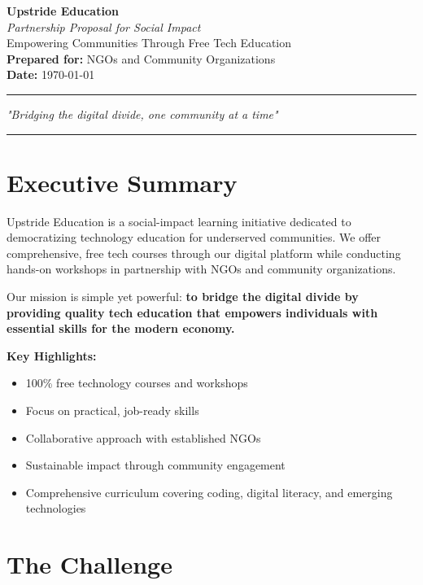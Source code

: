 \documentclass[12pt,a4paper]{article}
\begin{document}
\begin{center}
    {\Huge\textbf{\textcolor{upstrideblue}{Upstride Education}}} \\[0.5cm]
    {\Large\textit{Partnership Proposal for Social Impact}} \\[1cm]
    {\large Empowering Communities Through Free Tech Education} \\[2cm]
    
    \textbf{Prepared for:} NGOs and Community Organizations \\
    \textbf{Date:} \today \\[2cm]
    
    \hrule
    \vspace{0.3cm}
    {\large\textit{"Bridging the digital divide, one community at a time"}}
    \vspace{0.3cm}
    \hrule
\end{center}

\newpage

\tableofcontents
\newpage

\section{Executive Summary}

Upstride Education is a social-impact learning initiative dedicated to democratizing technology education for underserved communities. We offer comprehensive, free tech courses through our digital platform while conducting hands-on workshops in partnership with NGOs and community organizations.

Our mission is simple yet powerful: \textbf{to bridge the digital divide by providing quality tech education that empowers individuals with essential skills for the modern economy.}

\textbf{Key Highlights:}
\begin{itemize}[leftmargin=*]
    \item 100\% free technology courses and workshops
    \item Focus on practical, job-ready skills
    \item Collaborative approach with established NGOs
    \item Sustainable impact through community engagement
    \item Comprehensive curriculum covering coding, digital literacy, and emerging technologies
\end{itemize}

\section{The Challenge}
\end{document}
